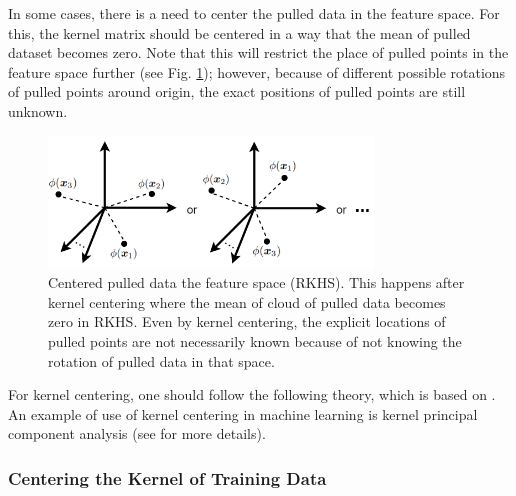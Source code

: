 \documentclass[lang=cn,10pt]{gorgeousnbook}
\numberwithin{equation}{section}%
\numberwithin{figure}{section}%
\begin{document}
In some cases, there is a need to center the pulled data in the feature space. For this, the kernel matrix should be centered in a way that the mean of pulled dataset becomes zero. Note that this will restrict the place of pulled points in the feature space further (see Fig. \ref{figure_centered_pulled_data}); however, because of different possible rotations of pulled points around origin, the exact positions of pulled points are still unknown. 

\begin{figure}[!t]
\centering
\includegraphics[width=3.4in]{./images/centered_pulled_data}
\caption{Centered pulled data the feature space (RKHS). This happens after kernel centering where the mean of cloud of pulled data becomes zero in RKHS. Even by kernel centering, the explicit locations of pulled points are not necessarily known because of not knowing the rotation of pulled data in that space.}
\label{figure_centered_pulled_data}
\end{figure}

For kernel centering, one should follow the following theory, which is based on \cite{scholkopf1997kernel}. An example of use of kernel centering in machine learning is kernel principal component analysis (see \cite{ghojogh2019unsupervised} for more details). 


\subsubsection{Centering the Kernel of Training Data}
\end{document}
